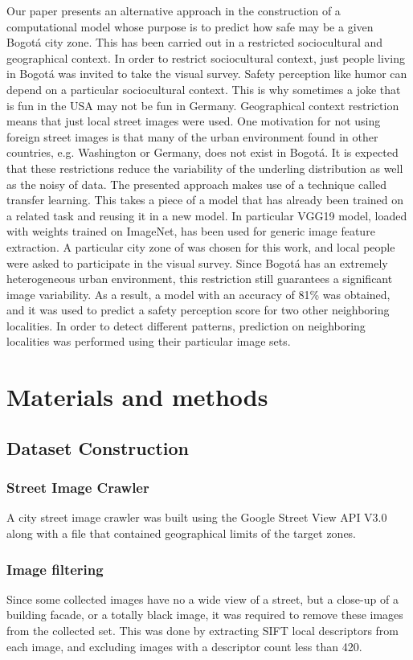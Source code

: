 \documentclass{llncs}
\begin{document}
Our paper presents an alternative approach in the construction of a computational model whose purpose is to predict how safe may be a given Bogotá city zone. This has been carried out in a restricted sociocultural and geographical context. In order to restrict sociocultural context, just people living in Bogotá was invited to take the visual survey. Safety perception like humor can depend on a particular sociocultural context. This is why sometimes a joke that is fun in the USA may not be fun in Germany. Geographical context restriction means that just local street images were used. One motivation for not using foreign street images is that many of the urban environment found in other countries, e.g. Washington or Germany, does not exist in Bogotá. It is expected that these restrictions reduce the variability of the underling distribution as well as the noisy of data. The presented approach makes use of a technique called transfer learning. This takes a piece of a model that has already been trained on a related task and reusing it in a new model. In particular VGG19 \cite{DBLP:journals/corr/SimonyanZ14a} model, loaded with weights trained on ImageNet, has been used for generic image feature extraction. A particular city zone of   was chosen for this work, and local people were asked to participate in the visual survey. Since Bogotá has an extremely heterogeneous urban environment, this restriction still guarantees a significant image variability.  As a result, a model with an accuracy of 81\%  was obtained, and it was used to predict a safety perception score for two other neighboring localities. In order to detect different patterns, prediction on neighboring localities was performed using their particular image sets.

\section{Materials and methods}
\subsection{Dataset Construction}
\subsubsection{Street Image Crawler}
A city street image crawler was built using the Google Street View API V3.0 along with a file that contained geographical limits of the target zones.

\subsubsection{Image filtering}
Since some collected images have no a wide view of a street, but a close-up of a building facade, or a totally black image, it was required to remove these images from the collected set. This was done by extracting SIFT local descriptors from each image, and excluding images with a descriptor count less than 420.
  
\end{document}
